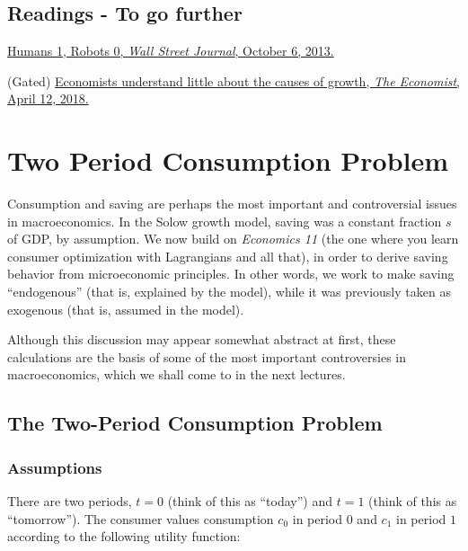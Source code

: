 \documentclass[]{book}
\begin{document}
\section*{Readings - To go further}\label{readings---to-go-further-1}

\href{https://www.wsj.com/articles/humans-1-robots-0-1381098947?tesla=y}{Humans
1, Robots 0, \emph{Wall Street Journal}, October 6, 2013.}

(Gated)
\href{https://www.economist.com/finance-and-economics/2018/04/12/economists-understand-little-about-the-causes-of-growth}{Economists
understand little about the causes of growth, \emph{The Economist},
April 12, 2018.}

\hypertarget{two-period}{\chapter{Two Period Consumption
Problem}\label{two-period}}

Consumption and saving are perhaps the most important and controversial
issues in macroeconomics. In the Solow growth model, saving was a
constant fraction \(s\) of GDP, by assumption. We now build on
\emph{Economics 11} (the one where you learn consumer optimization with
Lagrangians and all that), in order to derive saving behavior from
microeconomic principles. In other words, we work to make saving
``endogenous'' (that is, explained by the model), while it was
previously taken as exogenous (that is, assumed in the model).

Although this discussion may appear somewhat abstract at first, these
calculations are the basis of some of the most important controversies
in macroeconomics, which we shall come to in the next lectures.

\section{The Two-Period Consumption
Problem}\label{the-two-period-consumption-problem}

\subsection{Assumptions}\label{assumptions}

There are two periods, \(t=0\) (think of this as ``today'') and \(t=1\)
(think of this as ``tomorrow''). The consumer values consumption \(c_0\)
in period \(0\) and \(c_1\) in period \(1\) according to the following
utility function:
\end{document}
